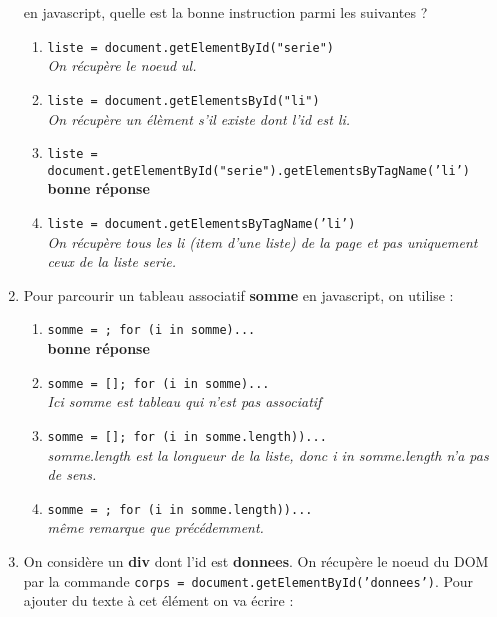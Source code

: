 \documentclass[]{scrartcl}
\begin{document}
\begin{enumerate}
                    en javascript, quelle est la bonne instruction parmi les suivantes ?
                    \begin{enumerate}
                        \item \texttt{liste = document.getElementById("serie")}\\
                        \textit{ On récupère le noeud ul.}
                        \item \texttt{liste = document.getElementsById("li")}\\ \textit{On récupère un élèment s'il existe dont l'id est li.}
                        \item \texttt{liste = document.getElementById("serie").getElementsByTagName('li')}\\ \textbf{bonne réponse}
                        \item \texttt{liste = document.getElementsByTagName('li')} \\ \textit{ On récupère tous les li (item d'une liste) de la page et pas uniquement ceux de la liste serie.}
                    \end{enumerate}
                    \item Pour parcourir un tableau associatif \textbf{somme} en javascript, on utilise :
                    \begin{enumerate}
                        \item \texttt{somme = {}; for (i in somme){...} } \\ \textbf{bonne réponse}
                        \item \texttt{somme = []; for (i in somme){...} } \\  \textit{Ici somme est tableau qui n'est pas associatif}
                        \item \texttt{somme = []; for (i in somme.length)){...} }\\  \textit{somme.length est la longueur de la liste, donc i in somme.length n'a pas de sens.}
                        \item \texttt{somme = {}; for (i in somme.length)){...} } \\ \textit{même remarque que précédemment.}
                    \end{enumerate}
                    \item On considère un \textbf{div} dont l'id est \textbf{donnees}. On récupère le noeud du DOM par la commande \texttt{corps = document.getElementById('donnees')}. Pour ajouter du texte à cet élément on va écrire :

\end{enumerate}
\end{document}
